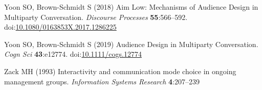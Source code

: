 \documentclass[
  english,
]{article}
\newlength{\cslhangindent}
\newlength{\cslentryspacingunit} %
\newenvironment{CSLReferences}[2] %
 {%
  \setlength{\parindent}{0pt}
  \ifodd #1
  \let\oldpar\par
  \def\par{\hangindent=\cslhangindent\oldpar}
  \fi
  \setlength{\parskip}{#2\cslentryspacingunit}
 }%
 {}
\begin{document}
\begin{CSLReferences}{1}{0}
\leavevmode{}%
Yoon SO, Brown-Schmidt S (2018) Aim {Low}: {Mechanisms} of {Audience Design} in {Multiparty Conversation}. \emph{Discourse Processes} \textbf{55}:566--592. doi:\href{https://doi.org/10.1080/0163853X.2017.1286225}{10.1080/0163853X.2017.1286225}

\leavevmode{}%
Yoon SO, Brown‐Schmidt S (2019) Audience {Design} in {Multiparty Conversation}. \emph{Cogn Sci} \textbf{43}:e12774. doi:\href{https://doi.org/10.1111/cogs.12774}{10.1111/cogs.12774}

\leavevmode{}%
Zack MH (1993) Interactivity and communication mode choice in ongoing management groups. \emph{Information Systems Research} \textbf{4}:207--239

\end{CSLReferences}
\end{document}
